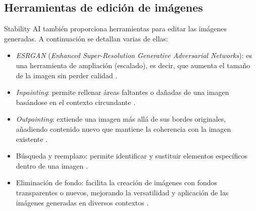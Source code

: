 \subsection{Herramientas de edición de imágenes}

Stability AI también proporciona herramientas para editar las imágenes generadas. A continuación se detallan varias de ellas:
\begin{itemize}
    \item \textit{ESRGAN} (\textit{Enhanced Super-Resolution Generative Adversarial Networks}): es una herramienta de ampliación (escalado), es decir, que aumenta el tamaño de la imagen sin perder calidad \cite{stabilityai2023upscale}.

    \item \textit{Inpainting}: permite rellenar áreas faltantes o dañadas de una imagen basándose en el contexto circundante \cite{stabilityai2023tools}.
    
    \item \textit{Outpainting}: extiende una imagen más allá de sus bordes originales, añadiendo contenido nuevo que mantiene la coherencia con la imagen existente \cite{stabilityai2023tools}.
    
    \item Búsqueda y reemplazo: permite identificar y sustituir elementos específicos dentro de una imagen \cite{stabilityai2023tools}. 
    
    \item Eliminación de fondo: facilita la creación de imágenes con fondos transparentes o nuevos, mejorando la versatilidad y aplicación de las imágenes generadas en diversos contextos \cite{stabilityai2023tools}.
\end{itemize}

